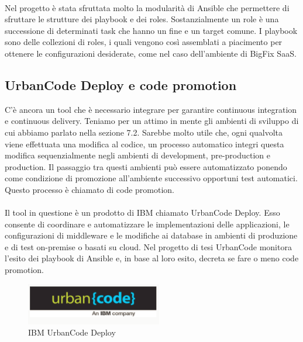 \paragraph{}
Nel progetto è stata sfruttata molto la modularità di Ansible che permettere di sfruttare le strutture dei playbook e dei roles. Sostanzialmente un role è una successione di determinati task che hanno un fine e un target comune. I playbook sono delle collezioni di roles, i quali vengono così assemblati a piacimento per ottenere le configurazioni desiderate, come nel caso dell'ambiente di BigFix SaaS. 
\subsection{UrbanCode Deploy e code promotion}
C'è ancora un tool che è necessario integrare per garantire continuous integration e continuous delivery. Teniamo per un attimo in mente gli ambienti di sviluppo di cui abbiamo parlato nella sezione 7.2. Sarebbe molto utile che, ogni qualvolta viene effettuata una modifica al codice, un processo automatico integri questa modifica sequenzialmente negli ambienti di development, pre-production e production. Il passaggio tra questi ambienti può essere automatizzato ponendo come condizione di promozione all'ambiente successivo opportuni test automatici. Questo processo è chiamato di code promotion. 
\paragraph{}
Il tool in questione è un prodotto di IBM chiamato UrbanCode Deploy. Esso consente di coordinare e automatizzare le implementazioni delle applicazioni, le configurazioni di middleware e le modifiche ai database in ambienti di produzione e di test on-premise o basati su cloud. Nel progetto di tesi UrbanCode monitora l'esito dei playbook di Ansible e, in base al loro esito, decreta se fare o meno code promotion.
\begin{figure}
	\centering
	\includegraphics[width=0.7\linewidth]{capitoli/imgs/ucd}
	\caption{IBM UrbanCode Deploy}
	\label{fig:ucd}
\end{figure}

